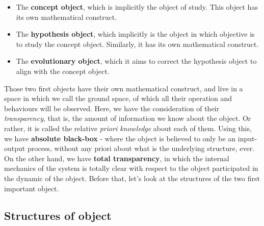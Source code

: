 \documentclass[10pt]{article}
\begin{document}
\begin{itemize}[topsep=1pt,itemsep=0.5pt]
    \item The \textbf{concept object}, which is implicitly the object of study. This object has its own mathematical construct. 
    \item The \textbf{hypothesis object}, which implicitly is the object in which objective is to study the concept object. Similarly, it has its own mathematical construct. 
    \item The \textbf{evolutionary object}, which it aims to correct the hypothesis object to align with the concept object. 
\end{itemize}
Those two first objects have their own mathematical construct, and live in a space in which we call the ground space, of which all their operation and behaviours will be observed. Here, we have the consideration of their \textit{transparency}, that is, the amount of information we know about the object. Or rather, it is called the relative \textit{priori knowledge} about each of them. Using this, we have \textbf{absolute black-box} - where the object is believed to only be an input-output process, without any priori about what is the underlying structure, ever. On the other hand, we have \textbf{total transparency}, in which the internal mechanics of the system is totally clear with respect to the object participated in the dynamic of the object. Before that, let's look at the structures of the two first important object. 
\subsection{Structures of object}
\end{document}
